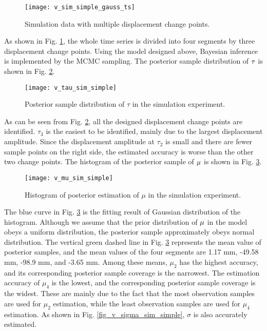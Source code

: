 \documentclass[final,3p,times]{elsarticle}
\begin{document}
	\begin{figure}[htbp]
		\centering
		\texttt{[image: v\_sim\_simple\_gauss\_ts]}
		\caption{Simulation data with multiple displacement change points.}
		\label{fig_v_sim_simple_gauss_ts}
	\end{figure} 
	As shown in Fig. \ref{fig_v_sim_simple_gauss_ts}, the whole time series is divided into four segments by three displacement change points. 
	Using the model designed above, Bayesian inference is implemented by the MCMC sampling. 
	The posterior sample distribution of $\bf{\tau}$ is shown in Fig. \ref{fig_v_tau_sim_simple}.
	
	
	\begin{figure}[htbp]
		\centering
		\texttt{[image: v\_tau\_sim\_simple]}
		\caption{Posterior sample distribution of $\tau$ in the simulation experiment.}
		\label{fig_v_tau_sim_simple}
	\end{figure} 
	As can be seen from Fig. \ref{fig_v_tau_sim_simple}, all the designed displacement change points are identified. 
	$\tau_3$ is the easiest to be identified, mainly due to the largest displacement amplitude. 
	Since the displacement amplitude at $\tau_2$ is small and there are fewer sample points on the right side, the estimated accuracy is worse than the other two change points.
	The histogram of the posterior sample of $\bf{\mu}$ is shown in Fig. \ref{fig_v_mu_sim_simple}.
	
	\begin{figure}[htbp]
		\centering
		\texttt{[image: v\_mu\_sim\_simple]}
		\caption{Histogram of posterior estimation of $\mu$ in the simulation experiment.}
		\label{fig_v_mu_sim_simple}
	\end{figure} 
	The blue curve in Fig. \ref{fig_v_mu_sim_simple} is the fitting result of Gaussian distribution of the histogram.
	Although we assume that the prior distribution of $\bf{\mu}$ in the model obeys a uniform distribution, the posterior sample approximately obeys normal distribution. 
	The vertical green dashed line in Fig. \ref{fig_v_mu_sim_simple} represents the mean value of posterior samples, and the mean values of the four segments are 1.17 mm, -49.58 mm, -98.9 mm, and -3.65 mm.
	Among these means, $\mu_2$ has the highest accuracy, and its corresponding posterior sample coverage is the narrowest. 
	The estimation accuracy of $\mu_4$ is the lowest, and the corresponding posterior sample coverage is the widest. 
	These are mainly due to the fact that the most observation samples are used for $\mu_2$ estimation, while the least observation samples are used for $\mu_4$ estimation. 
	As shown in Fig. \ref{fig_v_sigma_sim_simple}, $\sigma$ is also accurately estimated.
	
\end{document}
